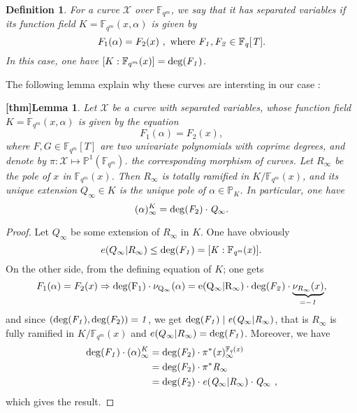 \documentclass[10pt]{article}
\newtheorem{def1}[thm]{Definition}
\newtheorem{lem1}{[thm]Lemma}
\newcommand{\s}{\vspace{0.3cm}}
\newcommand{\cd}{\cdot}
\newcommand{\PP}{\mathbb{P}}
\newcommand{\fqm}{\mathbb{F}_{q^m}}
\newcommand{\fq}{\mathbb{F}_q}
\newcommand{\X}{\mathcal{X}}
\begin{document}
\s

\begin{def1} \label{courbes à variables séparées}
For a curve $\X$ over $\fqm$, we say that it has separated variables if its function field $K=\fqm(x,\alpha)$ is given by
\[F_1(\alpha) = F_2(x) \ , \ \rm where \ \it  F_1,F_2 \in \fq[T].\]
In this case, one have $[K:\fqm(x)] = \rm{deg}(\it{F_1})$.
\end{def1}

\s

The following lemma explain why these curves are intersting in our case :

\s

\begin{lem1} \label{lemdegré}
Let $\X$ be a curve with separated variables, whose function field $K=\fqm(x,\alpha)$ is given by the equation
\[F_1(\alpha) = F_2(x),\]
where $F,G \in \fqm[T]$ are two univariate polynomials with coprime degrees, and denote by $\pi : \X \longmapsto \PP^1(\fqm)$. the corresponding morphism of curves. Let $R_{\infty}$ be the pole of $x$ in $\fqm(x)$. Then $R_{\infty}$ is totally ramified in $K/\fqm(x)$, and its unique extension $Q_{\infty} \in K$ is the unique pole of $\alpha \in \PP_K$. In particular, one have 
\[(\alpha)^K_{\infty} = \rm{deg}\it{(F_{\rm 2}) \cd Q_{\infty}}.\]
\end{lem1}

\s

\begin{proof}
Let $Q_{\infty}$ be some extension of $R_{\infty}$ in $K$. One have obviously
\[e(Q_{\infty}|R_{\infty}) \leq \rm{deg}\it(F_1)=[K:\fqm(x)].\]
On the other side, from the defining equation of $K$; one gets
\[F_1(\alpha) = F_2(x) \Rightarrow \rm{deg}(F_1) \cd \nu_{Q_{\infty}}(\alpha) = e(Q_{\infty}|R_{\infty}) \cd \rm{deg}\it(F_2) \cd \underbrace{\nu_{R_{\infty}}(x)}_{=-1},\]
and since $(\rm{deg}\it(F_1),\rm{deg}(\it F_{\rm 2}))=1$, we get $\rm{deg}\it(F_1) \mid e(Q_{\infty}|R_{\infty})$, that is $R_{\infty}$ is fully ramified in $K/\fqm(x)$ and $e(Q_{\infty}|R_{\infty})=\rm{deg}\it(F_1)$. Moreover, we have 
\begin{align*}
\rm{deg}\it(F_1) \cd (\alpha)^K_{\infty} &= \rm{deg}\it(F_{\rm 2}) \cd \pi^*(x)^{\fq(x)}_{\infty} \\
&= \rm{deg}\it(F_{\rm 2}) \cd \pi^* R_{\infty} \\
&= \rm{deg}\it(F_{\rm 2}) \cd e(Q_{\infty}|R_{\infty}) \cd Q_{\infty} \ ,
\end{align*}
which gives the result.
\end{proof}
\end{document}
